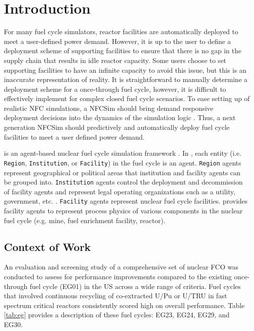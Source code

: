 \section{Introduction}
For many fuel cycle simulators, reactor facilities are automatically 
deployed to meet a user-defined power demand. 
However, it is up to the user to define a deployment scheme of 
supporting facilities to ensure that there is no gap in the supply 
chain that results in idle reactor capacity. 
Some users choose to set supporting facilities to have an infinite 
capacity to avoid this issue, but this is an inaccurate 
representation of reality. 
It is straightforward to manually determine a deployment scheme 
for a once-through fuel cycle, however, it is difficult to effectively 
implement for complex closed fuel cycle scenarios.  
To ease setting up of realistic \gls{NFC} simulations, a \gls{NFCSim}
should bring demand responsive deployment decisions into 
the dynamics of the simulation logic \cite{huff_current_2017}. 
Thus, a next generation \gls{NFCSim} should predictively and 
automatically deploy fuel cycle facilities to meet a user defined 
power demand. 

\Cyclus is an agent-based nuclear fuel cycle simulation framework 
\cite{huff_fundamental_2016}. 
In \Cyclus, each entity (i.e. \texttt{Region}, \texttt{Institution}, or \texttt{Facility}) in the 
fuel cycle is an agent. 
\texttt{Region} agents represent geographical or political areas that institution
and facility agents can be grouped into. 
\texttt{Institution} agents control the 
deployment and decommission of facility agents 
and represent legal operating organizations such as a 
utility, government, etc. \cite{huff_fundamental_2016}. 
\texttt{Facility} agents represent nuclear fuel cycle facilities. 
\Cycamore \cite{carlsen_cycamore_2014}
provides facility agents to represent process physics of various 
components in the nuclear fuel cycle (e.g. mine, fuel enrichment 
facility, reactor). 

\subsection{Context of Work}
An evaluation and screening study of a comprehensive set of nuclear 
\gls{FCO} \cite{wigeland_nuclear_2014} was conducted to assess 
for performance improvements compared to the existing once-through 
fuel cycle (EG01) in the \gls{US} across a wide range of criteria. 
Fuel cycles that involved continuous recycling
of co-extracted U/Pu or U/TRU in fast spectrum critical reactors
consistently scored high on overall performance.  
Table \ref{tab:eg} provides a description of these fuel cycles:
EG23, EG24, EG29, and EG30. 

